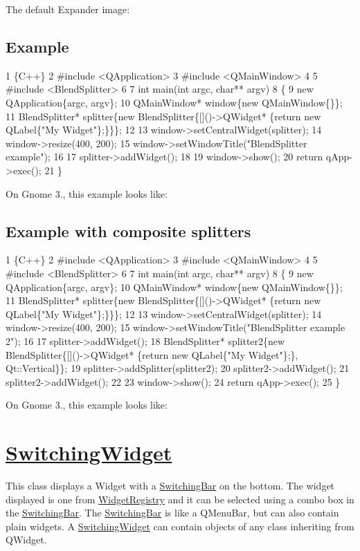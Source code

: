The default Expander image\+:

 \subsection*{Example }


\begin{DoxyCode}
1 \{C++\}
2 #include <QApplication>
3 #include <QMainWindow>
4 
5 #include <BlendSplitter>
6 
7 int main(int argc, char** argv)
8 \{
9     new QApplication\{argc, argv\};
10     QMainWindow* window\{new QMainWindow\{\}\};
11     BlendSplitter* splitter\{new BlendSplitter\{[]()->QWidget* \{return new QLabel\{"My Widget"\};\}\}\};
12 
13     window->setCentralWidget(splitter);
14     window->resize(400, 200);
15     window->setWindowTitle("BlendSplitter example");
16 
17     splitter->addWidget();
18 
19     window->show();
20     return qApp->exec();
21 \}
\end{DoxyCode}
 On Gnome 3., this example looks like\+:

 \subsection*{Example with composite splitters }


\begin{DoxyCode}
1 \{C++\}
2 #include <QApplication>
3 #include <QMainWindow>
4 
5 #include <BlendSplitter>
6 
7 int main(int argc, char** argv)
8 \{
9     new QApplication\{argc, argv\};
10     QMainWindow* window\{new QMainWindow\{\}\};
11     BlendSplitter* splitter\{new BlendSplitter\{[]()->QWidget* \{return new QLabel\{"My Widget"\};\}\}\};
12 
13     window->setCentralWidget(splitter);
14     window->resize(400, 200);
15     window->setWindowTitle("BlendSplitter example 2");
16 
17     splitter->addWidget();
18     BlendSplitter* splitter2\{new BlendSplitter\{[]()->QWidget* \{return new QLabel\{"My Widget"\};\},
       Qt::Vertical\}\};
19     splitter->addSplitter(splitter2);
20     splitter2->addWidget();
21     splitter2->addWidget();
22 
23     window->show();
24     return qApp->exec();
25 \}
\end{DoxyCode}
 On Gnome 3., this example looks like\+:

 \section*{\hyperlink{class_switching_widget}{Switching\+Widget} }

This class displays a Widget with a \hyperlink{class_switching_bar}{Switching\+Bar} on the bottom. The widget displayed is one from \hyperlink{class_widget_registry}{Widget\+Registry} and it can be selected using a combo box in the \hyperlink{class_switching_bar}{Switching\+Bar}. The \hyperlink{class_switching_bar}{Switching\+Bar} is like a Q\+Menu\+Bar, but can also contain plain widgets. A \hyperlink{class_switching_widget}{Switching\+Widget} can contain objects of any class inheriting from Q\+Widget.

